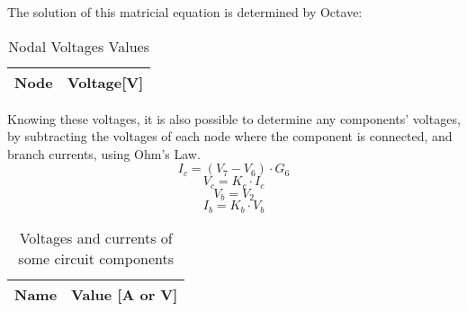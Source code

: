 The solution of this matricial equation is determined by Octave:
\begin{table}[H]
  \centering
  \begin{tabular}{|l|r|}
    \hline    
    {\bf Node} & {\bf Voltage[V]} \\ \hline
    
  \end{tabular}
  \caption{Nodal Voltages Values}
  \label{tab:nodal}
\end{table}

Knowing these voltages, it is also possible to determine any components' voltages, by subtracting the voltages of each node where the component is connected, and branch currents, using Ohm’s Law.
\begin{equation}
  I_c=(V_7-V_6)\cdot G_6
\end{equation}
\begin{equation}
  V_c=K_c\cdot I_c
\end{equation}
\begin{equation}
  V_b=V_2
\end{equation}
\begin{equation}
  I_b=K_b\cdot V_b
 \end{equation}
 
 \begin{table}[H]
  \centering
  \begin{tabular}{|l|r|}
    \hline    
    {\bf Name} & {\bf Value [A or V]} \\ \hline
    
  \end{tabular}
  \caption{Voltages and currents of some circuit components}
  \label{tab:valn}
\end{table}
